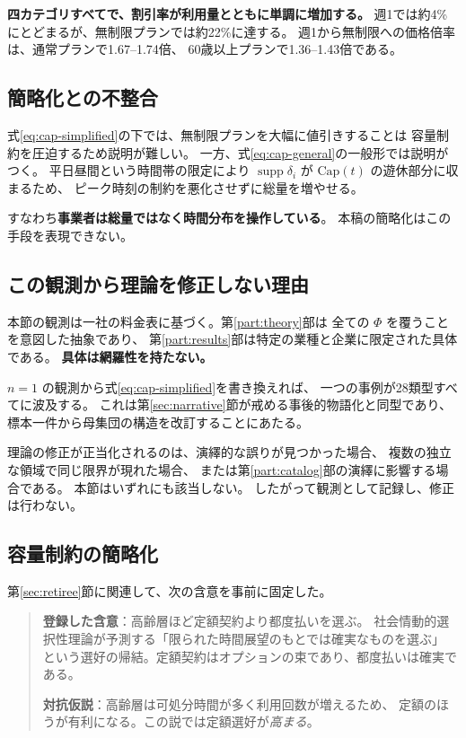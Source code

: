 \textbf{四カテゴリすべてで、割引率が利用量とともに単調に増加する。}
週1では約4\%にとどまるが、無制限プランでは約22\%に達する。
週1から無制限への価格倍率は、通常プランで1.67--1.74倍、
60歳以上プランで1.36--1.43倍である。

\subsection{簡略化との不整合}

式\eqref{eq:cap-simplified}の下では、無制限プランを大幅に値引きすることは
容量制約を圧迫するため説明が難しい。
一方、式\eqref{eq:cap-general}の一般形では説明がつく。
平日昼間という時間帯の限定により $\operatorname{supp}\delta_i$ が
$\mathrm{Cap}(t)$ の遊休部分に収まるため、
ピーク時刻の制約を悪化させずに総量を増やせる。

すなわち\textbf{事業者は総量ではなく時間分布を操作している}。
本稿の簡略化はこの手段を表現できない。

\subsection{この観測から理論を修正しない理由}

\begin{remark}[事例からの一般化を行わない]
\label{rem:no-generalization}
本節の観測は一社の料金表に基づく。第\ref{part:theory}部は
全ての $\Phi$ を覆うことを意図した抽象であり、
第\ref{part:results}部は特定の業種と企業に限定された具体である。
\textbf{具体は網羅性を持たない。}

$n=1$ の観測から式\eqref{eq:cap-simplified}を書き換えれば、
一つの事例が28類型すべてに波及する。
これは第\ref{sec:narrative}節が戒める事後的物語化と同型であり、
標本一件から母集団の構造を改訂することにあたる。

理論の修正が正当化されるのは、演繹的な誤りが見つかった場合、
複数の独立な領域で同じ限界が現れた場合、
または第\ref{part:catalog}部の演繹に影響する場合である。
本節はいずれにも該当しない。
したがって観測として記録し、修正は行わない。
\end{remark}

\subsection{容量制約の簡略化}

第\ref{sec:retiree}節に関連して、次の含意を事前に固定した。

\begin{quote}
\textbf{登録した含意}：高齢層ほど定額契約より都度払いを選ぶ。
社会情動的選択性理論が予測する「限られた時間展望のもとでは確実なものを選ぶ」
という選好の帰結。定額契約はオプションの束であり、都度払いは確実である。

\textbf{対抗仮説}：高齢層は可処分時間が多く利用回数が増えるため、
定額のほうが有利になる。この説では定額選好が\emph{高まる}。
\end{quote}

